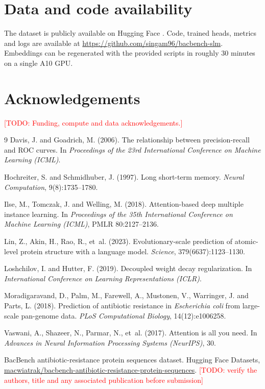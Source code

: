 \documentclass[11pt,a4paper]{article}
\newcommand{\todo}[1]{\textcolor{red}{[TODO: #1]}}
\begin{document}
\section*{Data and code availability}
The dataset is publicly available on Hugging Face \citep{bacbench}. Code, trained heads, metrics and logs are available at \url{https://github.com/singam96/bacbench-slm}.
Embeddings can be regenerated with the provided scripts in roughly 30 minutes on a single A10 GPU.

\section*{Acknowledgements}
\todo{Funding, compute and data acknowledgements.}

\begin{thebibliography}{9}
Davis, J. and Goadrich, M. (2006).
The relationship between precision-recall and ROC curves.
In \emph{Proceedings of the 23rd International Conference on Machine Learning (ICML)}.

Hochreiter, S. and Schmidhuber, J. (1997).
Long short-term memory.
\emph{Neural Computation}, 9(8):1735--1780.

Ilse, M., Tomczak, J. and Welling, M. (2018).
Attention-based deep multiple instance learning.
In \emph{Proceedings of the 35th International Conference on Machine Learning (ICML)}, PMLR 80:2127--2136.

Lin, Z., Akin, H., Rao, R., et~al. (2023).
Evolutionary-scale prediction of atomic-level protein structure with a language model.
\emph{Science}, 379(6637):1123--1130.

Loshchilov, I. and Hutter, F. (2019).
Decoupled weight decay regularization.
In \emph{International Conference on Learning Representations (ICLR)}.

Moradigaravand, D., Palm, M., Farewell, A., Mustonen, V., Warringer, J. and Parts, L. (2018).
Prediction of antibiotic resistance in \emph{Escherichia coli} from large-scale pan-genome data.
\emph{PLoS Computational Biology}, 14(12):e1006258.

Vaswani, A., Shazeer, N., Parmar, N., et~al. (2017).
Attention is all you need.
In \emph{Advances in Neural Information Processing Systems (NeurIPS)}, 30.

BacBench antibiotic-resistance protein sequences dataset.
Hugging Face Datasets, \url{macwiatrak/bacbench-antibiotic-resistance-protein-sequences}.
\todo{verify the authors, title and any associated publication before submission}
\end{thebibliography}
\end{document}
